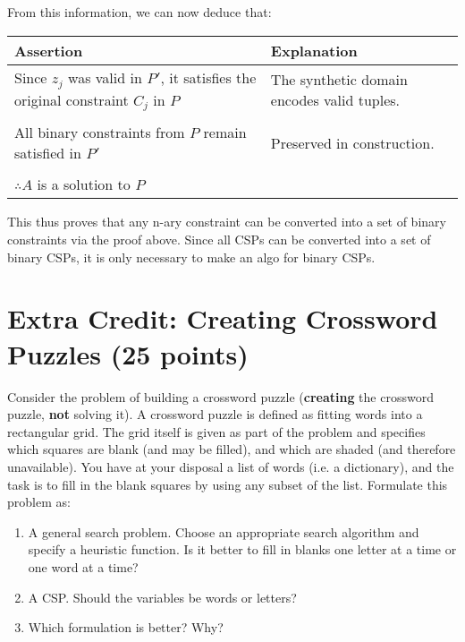 \documentclass[11pt]{article}
\newcommand{\question}[1]{\section*{\normalsize #1}}
\newenvironment{answercols}
  {\begin{center}\begin{tabular}{p{0.45\textwidth}p{0.45\textwidth}}
   \toprule
   \textbf{Assertion} & \textbf{Explanation} \\
   \midrule}
  {\\ \bottomrule\end{tabular}\end{center}}
\begin{document}
    From this information, we can now deduce that:

    \begin{answercols}
        Since $z_j$ was valid in $P'$, it satisfies the original constraint $C_j$ in $P$ &
        The synthetic domain encodes valid tuples. \\
        \\
        All binary constraints from $P$ remain satisfied in $P'$ &
        Preserved in construction. \\
        \\
        $\therefore A$ is a solution to $P$
    \end{answercols}

    \newpage

    \noindent This thus proves that any n-ary constraint can be converted into a set of binary constraints via the proof above. Since all CSPs can be converted into a set of binary CSPs, it is only necessary to make an algo for binary CSPs.


    \newpage


    \question{Extra Credit: Creating Crossword Puzzles (25 points)}
    Consider the problem of building a crossword puzzle (\textbf{creating} the crossword puzzle, \textbf{not} solving it). A crossword puzzle is defined as fitting words into a rectangular grid. The grid itself is given as part of the problem and specifies which squares are blank (and may be filled), and which are shaded (and therefore unavailable). You have at your disposal a list of words (i.e. a dictionary), and the task is to fill in the blank squares by using any subset of the list. Formulate this problem as:

    \begin{enumerate}[label=\alph*]
        \item A general search problem. Choose an appropriate search algorithm and specify a heuristic function. Is it better to fill in blanks one letter at a time or one word at a time?
        \item A CSP. Should the variables be words or letters?
        \item Which formulation is better? Why?\\ \\
    \end{enumerate}
\end{document}
